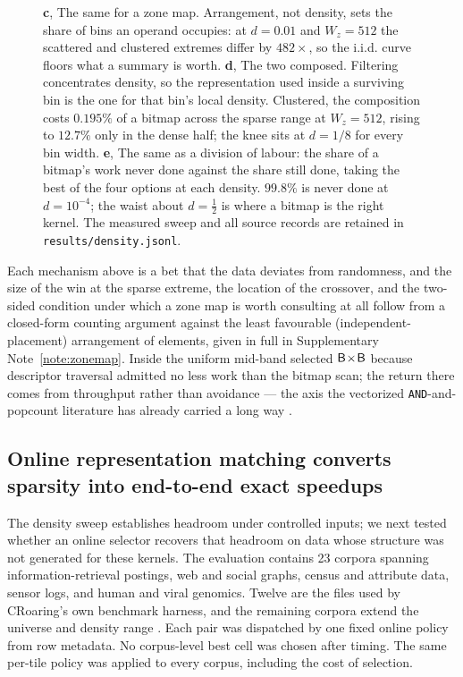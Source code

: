 \begin{figure}[!p]
{\textbf{c}, The same for a zone map. Arrangement, not density, sets the share of bins an operand
occupies: at $d = 0.01$ and $W_z = 512$ the scattered and clustered extremes differ by
$482\times$, so the i.i.d. curve floors what a summary is worth.
\textbf{d}, The two composed. Filtering concentrates density, so the representation used inside a
surviving bin is the one for that bin's local density. Clustered, the composition costs $0.195\%$ of
a bitmap across the sparse range at $W_z = 512$, rising to $12.7\%$ only in the dense half; the knee
sits at $d = 1/8$ for every bin width.
\textbf{e}, The same as a division of labour: the share of a bitmap's work never done against the
share still done, taking the best of the four options at each density. $99.8\%$ is never done
at $d = 10^{-4}$; the waist about $d = \tfrac12$ is where a bitmap is the right kernel.
The measured sweep and all source records are retained in \texttt{results/density.jsonl}.}
\label{fig:density-sweep}
\end{figure}

Each mechanism above is a bet that the data deviates from randomness, and the size of the win at the
sparse extreme, the location of the crossover, and the two-sided condition under which a zone map is
worth consulting at all follow from a closed-form counting argument against the least favourable
(independent-placement) arrangement of elements, given in full in Supplementary Note~\ref{note:zonemap}. Inside the
uniform mid-band selected $\textsf{B}\!\times\!\textsf{B}$ because descriptor traversal admitted no less work than
the bitmap scan; the return there comes from throughput rather than avoidance --- the axis the
vectorized \texttt{AND}-and-popcount literature has already carried a long way
\cite{mula2018popcount}.

\subsection*{Online representation matching converts sparsity into end-to-end exact speedups}
\label{sec:r2}

The density sweep establishes headroom under controlled inputs; we next tested whether an online
selector recovers that headroom on data whose structure was not generated for these kernels. The
evaluation contains 23 corpora spanning information-retrieval postings, web and social graphs,
census and attribute data, sensor logs, and human and viral genomics. Twelve are the files used by
CRoaring's own benchmark harness, and the remaining corpora extend the universe and density range
\cite{chambi2016roaring,lemire2018roaring}. Each pair was dispatched by one fixed online policy from
row metadata. No corpus-level best cell was chosen after timing. The same per-tile policy was
applied to every corpus, including the cost of selection.

